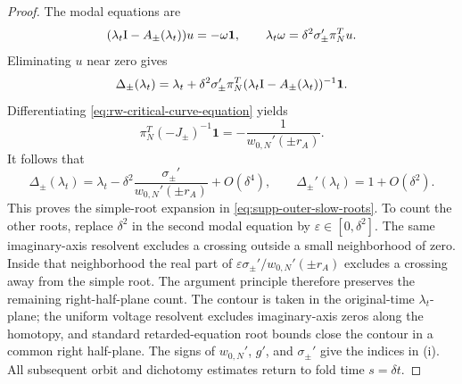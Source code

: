 \begin{proof}
The modal equations are
\[
 (\lambda_t\mathrm I-A_\pm(\lambda_t))u=-\omega\mathbf1,
 \qquad
 \lambda_t\omega=\delta^2\sigma_\pm'\pi_N^Tu.
\]
Eliminating \(u\) near zero gives
\[
 \Delta_\pm(\lambda_t)
 =\lambda_t+\delta^2\sigma_\pm'\pi_N^T
   (\lambda_t\mathrm I-A_\pm(\lambda_t))^{-1}\mathbf1.
\]
Differentiating \cref{eq:rw-critical-curve-equation} yields
\[
 \pi_N^T(-J_\pm)^{-1}\mathbf1
 =-\frac1{w_{0,N}'(\pm r_A)}.
\]
It follows that
\[
 \Delta_\pm(\lambda_t)
 =\lambda_t-\delta^2
   \frac{\sigma_\pm'}{w_{0,N}'(\pm r_A)}+O(\delta^4),
 \qquad
 \Delta_\pm'(\lambda_t)=1+O(\delta^2).
\]
This proves the simple-root expansion in
\cref{eq:supp-outer-slow-roots}.  To count the other roots, replace
\(\delta^2\) in the second modal equation by
\(\varepsilon\in[0,\delta^2]\).  The same imaginary-axis resolvent
excludes a crossing outside a small neighborhood of zero.  Inside that
neighborhood the real part of
\(\varepsilon\sigma_\pm'/w_{0,N}'(\pm r_A)\) excludes a crossing away
from the simple root.  The argument principle therefore preserves the
remaining right-half-plane count.  The contour is taken in the original-time
\(\lambda_t\)-plane; the uniform voltage resolvent excludes imaginary-axis
zeros along the homotopy, and standard retarded-equation root bounds close
the contour in a common right half-plane.  The signs of \(w_{0,N}'\),
\(g'\), and \(\sigma_\pm'\) give the indices in (i).  All subsequent orbit
and dichotomy estimates return to fold time \(s=\delta t\).
\end{proof}

